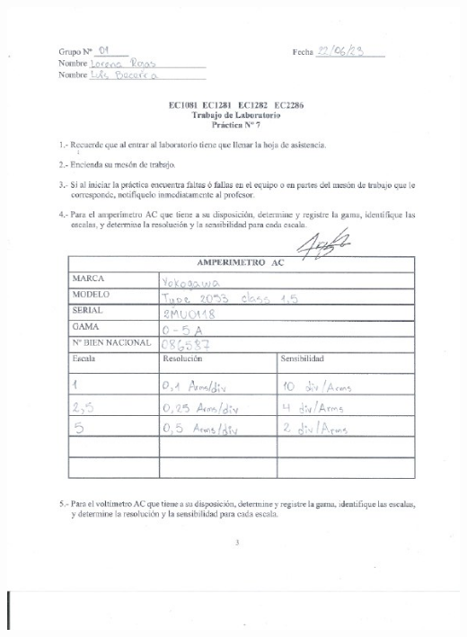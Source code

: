 \documentclass[12pt]{article}
\begin{document}
	\includegraphics[width=16cm,height=21cm]{Img/Resultados_1}\\
\end{document}
